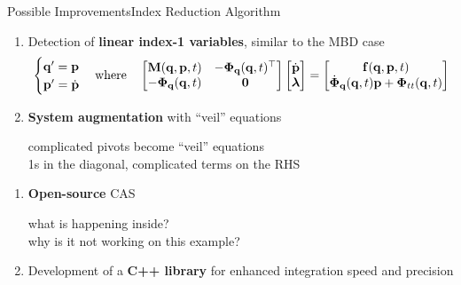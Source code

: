 \begin{frame}{Possible Improvements}{Index Reduction Algorithm}
    \begin{enumerate}
      \item<1> Detection of \textbf{linear index-1 variables}, similar to the \acs{MBD} case
      \begin{equation*}
        \begin{cases}
          \mathbf{q}^{\prime} = \mathbf{p} \\
          \mathbf{p}^{\prime} = \dot{\mathbf{p}}
        \end{cases}
        \text{where} \quad
        \begin{bmatrix}
          \mathbf{M}(\mathbf{q}, \mathbf{p}, t)      & -\boldsymbol{\Phi}_{\mathbf{q}}(\mathbf{q}, t)^{\top} \\
          -\boldsymbol{\Phi}_{\mathbf{q}}(\mathbf{q}, t) & \mathbf{0}
        \end{bmatrix}
        \begin{bmatrix}
          \dot{\mathbf{p}} \\ \boldsymbol{\lambda}
        \end{bmatrix} = \begin{bmatrix}
          \mathbf{f}(\mathbf{q}, \mathbf{p}, t) \\
          \dot{\boldsymbol{\Phi}}_{\mathbf{q}}(\mathbf{q}, t)\mathbf{p} + \boldsymbol{\Phi}_{tt}(\mathbf{q}, t)
        \end{bmatrix}
      \end{equation*}
      \item<2> \textbf{System augmentation} with ``veil'' equations \\
      \begin{small}
        \qquad complicated pivots become ``veil'' equations \\
        \qquad 1s in the diagonal, complicated terms on the RHS
      \end{small}
    \end{enumerate}
    \begin{enumerate}
      \item<3> \textbf{Open-source} \acs{CAS} \\
      \begin{small}
        \qquad what is happening inside? \\
        \qquad why is it not working on this example?
      \end{small}
      \item<4> Development of a \textbf{C++ library} for enhanced integration speed and precision
    \end{enumerate}
\end{frame}

